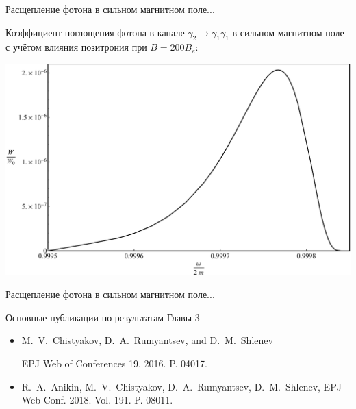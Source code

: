 \documentclass{beamer}
\begin{document}
\begin{frame}{Расщепление фотона в сильном магнитном поле...}
\begin{center}
Коэффициент поглощения фотона в канале $\gamma_2 \to\gamma_1 \gamma_1$ в сильном 
магнитном поле с учётом влияния позитрония при $B = 200 B_e$:

\includegraphics[scale=0.28]{211pos.pdf}

\end{center}
\end{frame}
\begin{frame}{Расщепление фотона в сильном магнитном поле...}

\begin{center}
Основные публикации по результатам Главы 3
\end{center}
% 
\begin{itemize}
%
\item
  M.~V.~Chistyakov, D.~A.~Rumyantsev, and D.~M.~Shlenev
 
  EPJ Web of Conferences 19. 2016. P. 04017.

\item R.~A.~Anikin, M.~V.~Chistyakov, D.~A.~Rumyantsev, D.~M.~Shlenev,
 EPJ Web Conf. 2018. Vol. 191. P. 08011.
\end{itemize}
\end{frame}
\end{document}
